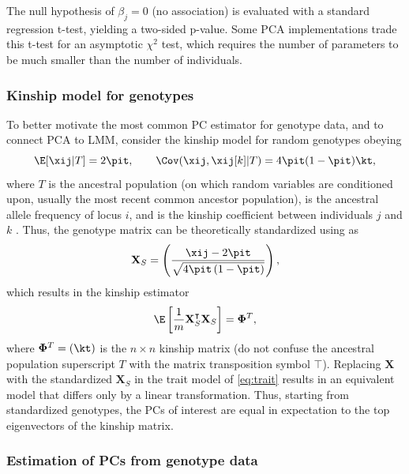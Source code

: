 \documentclass[11pt]{article}
\begin{document}
The null hypothesis of $\beta_j = 0$ (no association) is evaluated with a standard regression t-test, yielding a two-sided p-value.
Some PCA implementations trade this t-test for an asymptotic $\chi^2$ test, which requires the number of parameters to be much smaller than the number of individuals.

\subsubsection{Kinship model for genotypes}

To better motivate the most common PC estimator for genotype data, and to connect PCA to LMM, consider the kinship model for random genotypes obeying
$$
\E[ \xij | T ]
=
2 \pit,
\quad\quad
\Cov( \xij, \xij[k] | T )
=
4 \pit ( 1 - \pit ) \kt,
$$
where $T$ is the ancestral population (on which random variables are conditioned upon, usually the most recent common ancestor population), \pit is the ancestral allele frequency of locus $i$, and \kt is the kinship coefficient between individuals $j$ and $k$ \citep{malecot_mathematiques_1948, wright_genetical_1951, jacquard_structures_1970}.
Thus, the genotype matrix can be theoretically standardized using \pit as
$$
\mathbf{X}_S
=
\left(
  \frac{
    \xij - 2 \pit
  }{
    \sqrt{4 \pit \left( 1 - \pit \right)}
  }
\right)
,
$$
which results in the kinship estimator
$$
\E
\left[
\frac{1}{m}
\mathbf{X}_S^\intercal
\mathbf{X}_S
\right]
=
\mathbf{\Phi}^T
,
$$
where $\mathbf{\Phi}^T = ( \kt )$ is the $n \times n$ kinship matrix (do not confuse the ancestral population superscript $T$ with the matrix transposition symbol $\intercal$).
Replacing $\mathbf{X}$ with the standardized $\mathbf{X}_S$ in the trait model of \cref{eq:trait} results in an equivalent model that differs only by a linear transformation.
Thus, starting from standardized genotypes, the PCs of interest are equal in expectation to the top eigenvectors of the kinship matrix.

\subsubsection{Estimation of PCs from genotype data}
\end{document}
